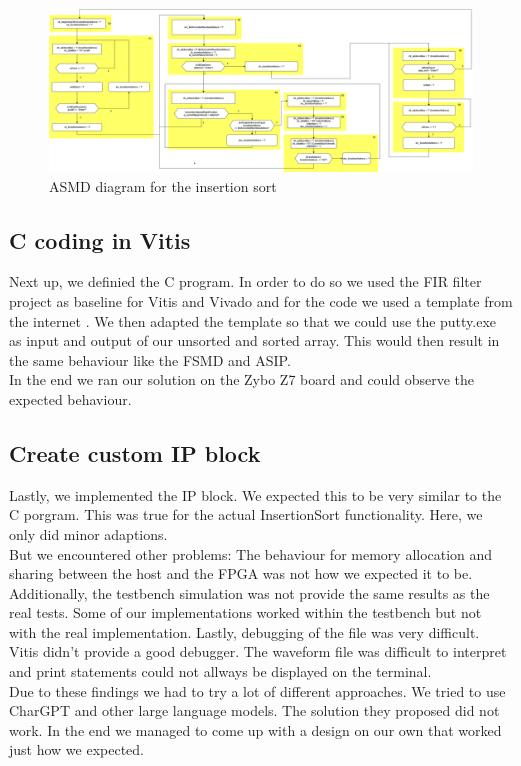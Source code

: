 \documentclass[conference]{IEEEtran}
\begin{document}
\begin{figure}
    \centering
    \includegraphics[width=1\linewidth]{Images/ASMDInsertionSort.png}
    \caption{ASMD diagram for the insertion sort}
    \label{fig:asmd}
\end{figure}
\subsection{C coding in Vitis}
Next up, we definied the C program. In order to do so we used the FIR filter project as baseline for Vitis and Vivado and for the code we used a template from the internet \cite{g4g}. We then adapted the template so that we could use the putty.exe as input and output of our unsorted and sorted array. This would then result in the same behaviour like the FSMD and ASIP.\\
In the end we ran our solution on the Zybo Z7 board and could observe the expected behaviour.

\subsection{Create custom IP block}
Lastly, we implemented the IP block. We expected this to be very similar to the C porgram. This was true for the actual InsertionSort functionality. Here, we only did minor adaptions.\\ 
But we encountered other problems: The behaviour for memory allocation and sharing between the host and the FPGA was not how we expected it to be. Additionally, the testbench simulation was not provide the same results as the real tests. Some of our implementations worked within the testbench but not with the real implementation. Lastly, debugging of the file was very difficult. Vitis didn't provide a good debugger. The waveform file was difficult to interpret and print statements could not allways be displayed on the terminal. \\
Due to these findings we had to try a lot of different approaches. We tried to use CharGPT and other large language models. The solution they proposed did not work. In the end we managed to come up with a design on our own that worked just how we expected.
\end{document}
